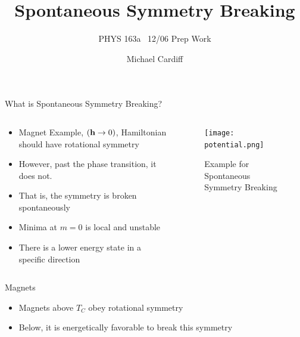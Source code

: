\documentclass{beamer}
\title{Spontaneous Symmetry Breaking}
\author{Michael Cardiff}
\subtitle{PHYS 163a \ 12/06 Prep Work}
\begin{document}
\begin{frame}
  \titlepage
\end{frame}

\begin{frame}{What is Spontaneous Symmetry Breaking?}
  \begin{columns}
    \begin{column}{0.5\textwidth}
      \begin{itemize}
      \item Magnet Example, $(\vb{h}\to0)$, Hamiltonian should have rotational symmetry
      \item However, past the phase transition, it does not.
      \item That is, the symmetry is broken spontaneously
      \item Minima at $m=0$ is local and unstable
      \item There is a lower energy state in a specific direction
      \end{itemize}
    \end{column}
    \begin{column}{0.5\textwidth}
      \begin{figure}[H]
        \centering
        \texttt{[image: potential.png]}
        \caption{Example for Spontaneous Symmetry Breaking}
      \end{figure}
    \end{column}
  \end{columns}
\end{frame}
\begin{frame}{Magnets}
  \begin{itemize}
  \item Magnets above $T_C$ obey rotational symmetry
  \item Below, it is energetically favorable to break this symmetry
  \end{itemize}
\end{frame}
\end{document}
